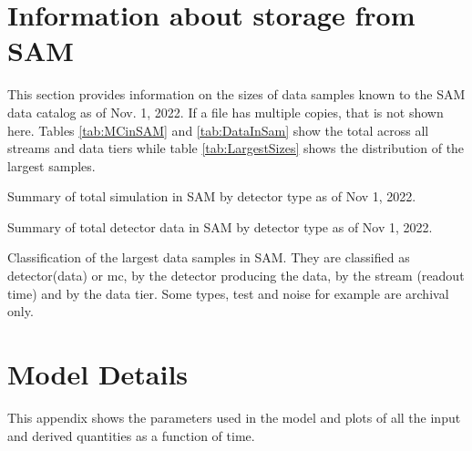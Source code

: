 \documentclass[12pt]{article}
\begin{document}
%



\clearpage
\appendix

\section{Information about storage from SAM}\label{storage}

This section provides information on the sizes of data samples known to the SAM data catalog as of Nov. 1, 2022.  If a file has multiple copies, that is not shown here.  Tables \ref{tab:MCinSAM} and \ref{tab:DataInSam} show the total across all streams and data tiers while table \ref{tab:LargestSizes} shows the distribution of the largest samples.  


\begin{table}[ht]
 \centering{}
\caption{Summary  of total simulation in SAM by detector type as of Nov 1, 2022.} 
\label{tab:MCinSAM}
\end{table}

\begin{table}[ht]
 \centering{}
 \caption{Summary  of total detector data in SAM by detector type as of Nov 1, 2022.}
 \label{tab:DataInSam}
\end{table}



\begin{table}[ht]
 \centering{}
\caption{Classification of the largest data samples in SAM.  They are classified as detector(data) or mc, by the detector producing the data, by the stream (readout time) and by the data tier.  Some types, test and noise for example are archival only.  }
 \label{tab:LargestSizes}
\end{table}
\clearpage
\section{Model Details}

This appendix shows the parameters used in the model and plots of all the input and derived quantities as a function of time. 
\end{document}
